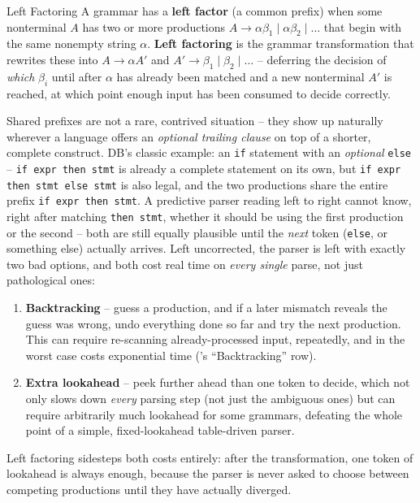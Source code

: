\documentclass[full-course-notes.tex]{subfiles}
\begin{document}
\begin{defbox}{Left Factoring}
A grammar has a \textbf{left factor} (a common prefix) when some nonterminal $A$ has two or
more productions $A \to \alpha\beta_1 \mid \alpha\beta_2 \mid \dots$ that begin with the same
nonempty string $\alpha$. \textbf{Left factoring} is the grammar transformation that rewrites
these into $A \to \alpha A' $ and $A' \to \beta_1 \mid \beta_2 \mid \dots$ -- deferring the
decision of \emph{which} $\beta_i$ until after $\alpha$ has already been matched and a new
nonterminal $A'$ is reached, at which point enough input has been consumed to decide correctly.
\end{defbox}

\begin{coreidea}
Shared prefixes are not a rare, contrived situation -- they show up naturally wherever a
language offers an \emph{optional trailing clause} on top of a shorter, complete construct.
DB's classic example: an \texttt{if} statement with an \emph{optional} \texttt{else} --
\texttt{if expr then stmt} is already a complete statement on its own, but
\texttt{if expr then stmt else stmt} is also legal, and the two productions share the entire
prefix \texttt{if expr then stmt}. A predictive parser reading left to right cannot know, right
after matching \texttt{then stmt}, whether it should be using the first production or the
second -- both are still equally plausible until the \emph{next} token (\texttt{else}, or
something else) actually arrives. Left uncorrected, the parser is left with exactly two bad
options, and both cost real time on \emph{every single} parse, not just pathological ones:
\begin{enumerate}
  \item \textbf{Backtracking} -- guess a production, and if a later mismatch reveals the guess
  was wrong, undo everything done so far and try the next production. This can require
  re-scanning already-processed input, repeatedly, and in the worst case costs exponential
  time ('s ``Backtracking'' row).
  \item \textbf{Extra lookahead} -- peek further ahead than one token to decide, which not only
  slows down \emph{every} parsing step (not just the ambiguous ones) but can require
  arbitrarily much lookahead for some grammars, defeating the whole point of a simple,
  fixed-lookahead table-driven parser.
\end{enumerate}
Left factoring sidesteps both costs entirely: after the transformation, one token of lookahead
is always enough, because the parser is never asked to choose between competing productions
until they have actually diverged.
\end{coreidea}
\end{document}
